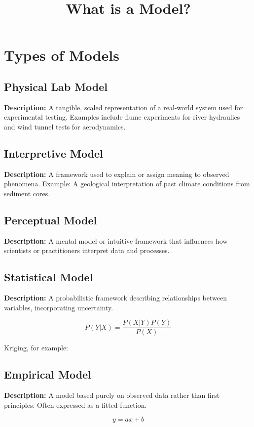 \documentclass{article}
\title{What is a Model?}
\author{}
\date{}
\begin{document}
\maketitle

\section{Types of Models}

\subsection{Physical Lab Model}
\textbf{Description:} A tangible, scaled representation of a real-world system used for experimental testing. Examples include flume experiments for river hydraulics and wind tunnel tests for aerodynamics.

\subsection{Interpretive Model}
\textbf{Description:} A framework used to explain or assign meaning to observed phenomena. Example: A geological interpretation of past climate conditions from sediment cores.

\subsection{Perceptual Model}
\textbf{Description:} A mental model or intuitive framework that influences how scientists or practitioners interpret data and processes.



\subsection{Statistical Model}
\textbf{Description:} A probabilistic framework describing relationships between variables, incorporating uncertainty.

\[
P(Y | X) = \frac{P(X | Y) P(Y)}{P(X)}
\]

Kriging, for example:


\subsection{Empirical Model}
\textbf{Description:} A model based purely on observed data rather than first principles. Often expressed as a fitted function.

\[
y = ax + b
\]
\end{document}
